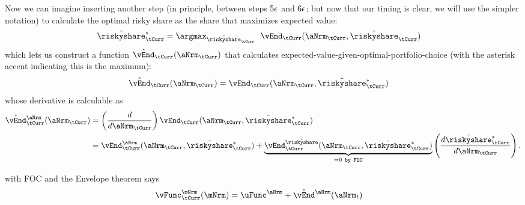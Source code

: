 \documentclass[./SolvingMicroDSOPs]{subfiles}
\begin{document}
	Now we can imagine inserting another step (in principle, between steps $5\epsilon$ and $6\epsilon$; but now that our timing is clear, we will use the simpler notation) to calculate the optimal risky share as the share that maximizes expected value:
	\begin{align}
		\Rend{\riskyshare}_{\tCurr}^{*} & = \argmax_{\Rend{\riskyshare}_{\tCurr}} ~~\vEnd_{\tCurr}(\aNrm_{\tCurr},\Rend{\riskyshare}_{\tCurr})
	\end{align}
	which lets us construct a function $\Maxed{\vEnd}_{\tCurr}(\aNrm_{\tCurr})$ that calculates expected-value-given-optimal-portfolio-choice (with the asterisk accent indicating this is the maximum):
	\begin{align}
		\Maxed{\vEnd}_{\tCurr}(\aNrm_{\tCurr}) & = \vEnd_{\tCurr}(\aNrm_{\tCurr},\Rend{\riskyshare}_{\tCurr}^{*})       
	\end{align}
	whose derivative is calculable as
	\begin{align}
		\Maxed{\vEnd}_{\tCurr}^{\aNrm}(\aNrm_{\tCurr}) & = \left(\frac{d}{d \aNrm_{\tCurr}}\right) \vEnd_{\tCurr}(\aNrm_{\tCurr},\Rend{\riskyshare}_{\tCurr}^{*}) 
		\\ & = \vEnd_{\tCurr}^{\aNrm}(\aNrm_{\tCurr},\Rend{\riskyshare}_{\tCurr}^{*})+\underbrace{
			\vEnd_{\tCurr}^{\Rend{\riskyshare}}(\aNrm_{\tCurr},\Rend{\riskyshare}_{\tCurr}^{*})}_{=0~\texttt{by FOC}}\left(\frac{d \Rend{\riskyshare}_{\tCurr}^{*}}{d \aNrm_{\tCurr}}\right) \notag.
	\end{align}
	
	with FOC
	and the Envelope theorem says
	\begin{align}
		\vFunc^{\mNrm}_{\tCurr}(\mNrm) & = \uFunc^{\aNrm}+\Maxed{\vEnd}^{\aNrm}(\aNrm_{t})
	\end{align}
	
\end{document}
